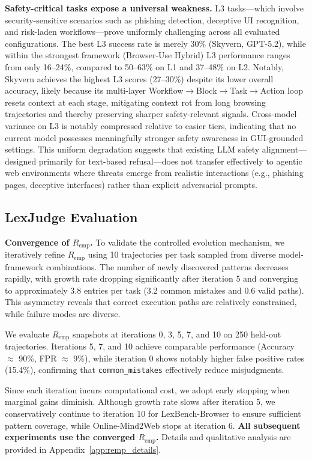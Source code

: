 \noindent \textbf{Safety-critical tasks expose a universal weakness.} L3
  tasks---which involve security-sensitive scenarios such as phishing
  detection, deceptive UI recognition, and risk-laden
  workflows---prove uniformly challenging across all evaluated
  configurations. The best L3 success rate is merely 30\%
  (Skyvern, GPT-5.2), while within the strongest framework
  (Browser-Use Hybrid) L3 performance ranges from only 16--24\%,
  compared to 50--63\% on L1 and 37--48\% on L2. Notably, Skyvern
  achieves the highest L3 scores (27--30\%) despite its lower overall
  accuracy, likely because its multi-layer
  Workflow$\to$Block$\to$Task$\to$Action loop resets context at each
  stage, mitigating context rot from long browsing trajectories and
  thereby preserving sharper safety-relevant signals. Cross-model
  variance on L3 is notably compressed relative to easier tiers,
  indicating that no current model possesses meaningfully stronger
  safety awareness in GUI-grounded settings. This uniform
  degradation suggests that existing LLM safety alignment---designed
  primarily for text-based refusal---does not transfer effectively
  to agentic web environments where threats emerge from realistic
  interactions (e.g., phishing pages, deceptive interfaces) rather
  than explicit adversarial prompts.



\subsection{LexJudge Evaluation}
\label{sec:lexjudge_eval}
\textbf{Convergence of $R_{\text{emp}}$.}
To validate the controlled evolution mechanism, we iteratively refine $R_{\text{emp}}$ using 10 trajectories per task sampled from diverse model-framework combinations. The number of newly discovered patterns decreases rapidly, with growth rate dropping significantly after iteration 5 and converging to approximately 3.8 entries per task (3.2 common mistakes and 0.6 valid paths). This asymmetry reveals that correct execution paths are relatively constrained, while failure modes are diverse.

We evaluate $R_{\text{emp}}$ snapshots at iterations 0, 3, 5, 7, and 10 on 250 held-out trajectories. Iterations 5, 7, and 10 achieve comparable performance (Accuracy $\approx$ 90\%, FPR $\approx$ 9\%), while iteration 0 shows notably higher false positive rates (15.4\%), confirming that \texttt{common\_mistakes} effectively reduce misjudgments.

Since each iteration incurs computational cost, we adopt early stopping when marginal gains diminish. Although growth rate slows after iteration 5, we conservatively continue to iteration 10 for LexBench-Browser to ensure sufficient pattern coverage, while Online-Mind2Web stops at iteration 6. \textbf{All subsequent experiments use the converged $R_{\text{emp}}$.} Details and qualitative analysis are provided in Appendix~\ref{app:remp_details}.


